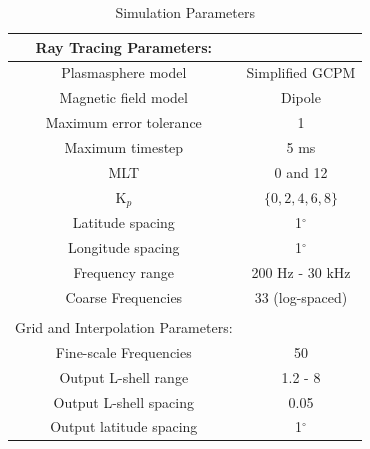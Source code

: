 \begin{table}[h!]
\caption{Simulation Parameters}
\begin{center}

\begin{tabular}{c|c}
Ray Tracing Parameters: & \\
\hline \hline
Plasmasphere model & Simplified GCPM \\
Magnetic field model & Dipole \\
Maximum error tolerance & 1\E{-3} \\
Maximum timestep & 5 ms \\
MLT & 0 and 12 \\
K$_p$ & $\{0, 2, 4, 6, 8\}$ \\
Latitude spacing & 1$^\circ$ \\
Longitude spacing & 1$^\circ$ \\
Frequency range & 200 Hz - 30 kHz \\
Coarse Frequencies & 33 (log-spaced) \\
& \\
Grid and Interpolation Parameters: \\
\hline \hline
Fine-scale Frequencies & 50 \\
Output L-shell range & 1.2 - 8 \\
Output L-shell spacing & 0.05 \\
Output latitude spacing & 1$^\circ$ \\
\end{tabular}
%
\end{center}
\label{tab:simulation_params}
\end{table}%

